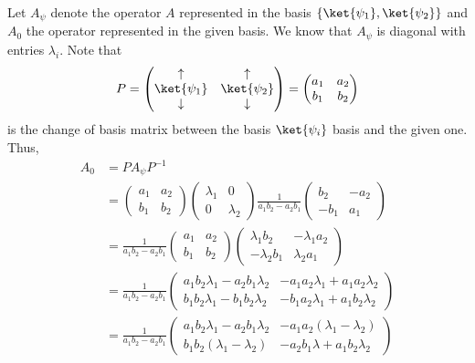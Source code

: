\documentclass[12pt]{article}
\begin{document}
\begin{ans}
    Let $A_\psi$ denote the operator $A$ represented in the basis $\{\ket{\psi_1}, \ket{\psi_2}\}$ and $A_0$ the operator represented in the given basis. We know that $A_\psi$ is diagonal with entries $\lambda_i$. Note that 
    \[P = \begin{pmatrix}
        \uparrow & \uparrow \\ 
        \ket{\psi_1} & \ket{\psi_2} \\ 
        \downarrow & \downarrow
    \end{pmatrix} 
    = \begin{pmatrix}
        a_1 & a_2 \\ 
        b_1 & b_2
    \end{pmatrix}\]
    is the change of basis matrix between the basis $\ket{\psi_i}$ basis and the given one. Thus, 
    \begin{align*}
        A_0 &= PA_\psi P^{-1}\\ 
        &= \begin{pmatrix}
        a_1 & a_2 \\ 
        b_1 & b_2
    \end{pmatrix}\begin{pmatrix}
        \lambda_1 & 0 \\ 
        0 & \lambda_2
    \end{pmatrix}\frac1{a_1b_2 - a_2b_1}\begin{pmatrix}
        b_2 & -a_2 \\ 
        -b_1 & a_1
    \end{pmatrix} \\
    &= \frac1{a_1b_2 - a_2b_1}\begin{pmatrix}
        a_1 & a_2 \\ 
        b_1 & b_2
    \end{pmatrix}\begin{pmatrix}
        \lambda_1 b_2 & -\lambda_1 a_2 \\ 
        -\lambda_2 b_1 & \lambda_2a_1
    \end{pmatrix}\\
    &= \frac1{a_1b_2 - a_2b_1}\begin{pmatrix}
        a_1b_2\lambda_1 - a_2b_1\lambda_2  & -a_1a_2\lambda_1 + a_1a_2\lambda_2 \\ 
        b_1b_2\lambda_1 - b_1b_2\lambda_2 & -b_1a_2\lambda_1 + a_1b_2\lambda_2
    \end{pmatrix}\\
    &= \frac1{a_1b_2 - a_2b_1}\begin{pmatrix}
        a_1b_2\lambda_1 - a_2b_1\lambda_2 & -a_1a_2(\lambda_1 - \lambda_2)\\
        b_1b_2(\lambda_1 - \lambda_2) & -a_2b_1 \lambda + a_1b_2\lambda_2
    \end{pmatrix}
    \end{align*}
\end{ans}
\end{document}

